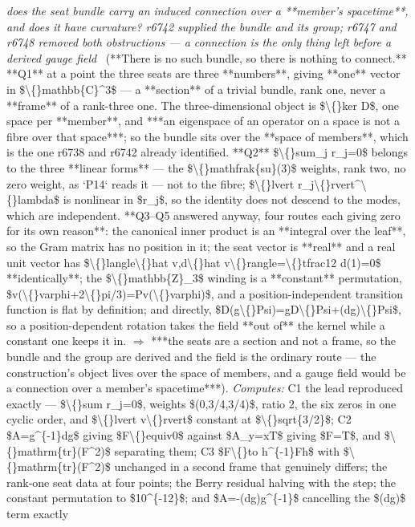 \begin{description}
\textit{does the seat bundle carry an induced connection over a **member's spacetime**, and does it have curvature? r6742 supplied the bundle and its group; r6747 and r6748 removed both obstructions --- a connection is the only thing left before a derived gauge field} \ (**There is no such bundle, so there is nothing to connect.**  **Q1** at a point the three seats are three **numbers**, giving **one** vector in \$\textbackslash\{\}mathbb\{C\}\textasciicircum{}3\$ --- a **section** of a trivial bundle, rank one, never a **frame** of a rank-three one. The three-dimensional object is \$\textbackslash\{\}ker D\$, one space per **member**, and ***an eigenspace of an operator on a space is not a fibre over that space***; so the bundle sits over the **space of members**, which is the one r6738 and r6742 already identified.  **Q2** \$\textbackslash\{\}sum\_j r\_j=0\$ belongs to the three **linear forms** --- the \$\textbackslash\{\}mathfrak\{su\}(3)\$ weights, rank two, no zero weight, as `P14` reads it --- not to the fibre; \$\textbackslash\{\}lvert r\_j\textbackslash\{\}rvert\textasciicircum{}\textbackslash\{\}lambda\$ is nonlinear in \$r\_j\$, so the identity does not descend to the modes, which are independent.  **Q3--Q5 answered anyway, four routes each giving zero for its own reason**: the canonical inner product is an **integral over the leaf**, so the Gram matrix has no position in it; the seat vector is **real** and a real unit vector has \$\textbackslash\{\}langle\textbackslash\{\}hat v,d\textbackslash\{\}hat v\textbackslash\{\}rangle=\textbackslash\{\}tfrac12 d(1)=0\$ **identically**; the \$\textbackslash\{\}mathbb\{Z\}\_3\$ winding is a **constant** permutation, \$v(\textbackslash\{\}varphi+2\textbackslash\{\}pi/3)=Pv(\textbackslash\{\}varphi)\$, and a position-independent transition function is flat by definition; and directly, \$D(g\textbackslash\{\}Psi)=gD\textbackslash\{\}Psi+(dg)\textbackslash\{\}Psi\$, so a position-dependent rotation takes the field **out of** the kernel while a constant one keeps it in. \ensuremath{\Rightarrow} ***the seats are a section and not a frame, so the bundle and the group are derived and the field is the ordinary route --- the construction's object lives over the space of members, and a gauge field would be a connection over a member's spacetime***). 
\emph{Computes:} C1 the lead reproduced exactly --- \$\textbackslash\{\}sum r\_j=0\$, weights \$(0,3/4,3/4)\$, ratio 2, the six zeros in one cyclic order, and \$\textbackslash\{\}lvert v\textbackslash\{\}rvert\$ constant at \$\textbackslash\{\}sqrt\{3/2\}\$; C2 \$A=g\textasciicircum{}\{-1\}dg\$ giving \$F\textbackslash\{\}equiv0\$ against \$A\_y=xT\$ giving \$F=T\$, and \$\textbackslash\{\}mathrm\{tr\}(F\textasciicircum{}2)\$ separating them; C3 \$F\textbackslash\{\}to h\textasciicircum{}\{-1\}Fh\$ with \$\textbackslash\{\}mathrm\{tr\}(F\textasciicircum{}2)\$ unchanged in a second frame that genuinely differs; the rank-one seat data at four points; the Berry residual halving with the step; the constant permutation to \$10\textasciicircum{}\{-12\}\$; and \$A=-(dg)g\textasciicircum{}\{-1\}\$ cancelling the \$(dg)\$ term exactly

\end{description}
